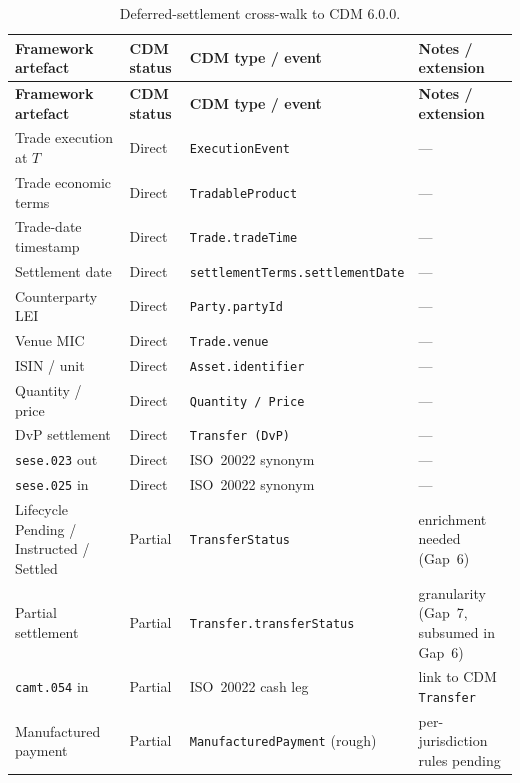 \documentclass[11pt,a4paper]{article}
\begin{document}
\begin{small}
\begin{longtable}{p{4.2cm}p{2.2cm}p{4.5cm}p{4.2cm}}
\caption{Deferred-settlement cross-walk to CDM 6.0.0.}\\
\toprule
\textbf{Framework artefact} & \textbf{CDM status} & \textbf{CDM type / event} & \textbf{Notes / extension} \\
\midrule
\endfirsthead
\toprule
\textbf{Framework artefact} & \textbf{CDM status} & \textbf{CDM type / event} & \textbf{Notes / extension} \\
\midrule
\endhead
Trade execution at $T$               & Direct  & \texttt{ExecutionEvent}            & --- \\
Trade economic terms                 & Direct  & \texttt{TradableProduct}           & --- \\
Trade-date timestamp                 & Direct  & \texttt{Trade.tradeTime}           & --- \\
Settlement date                      & Direct  & \texttt{settlementTerms.settlementDate} & --- \\
Counterparty LEI                     & Direct  & \texttt{Party.partyId}             & --- \\
Venue MIC                            & Direct  & \texttt{Trade.venue}               & --- \\
ISIN / unit                          & Direct  & \texttt{Asset.identifier}          & --- \\
Quantity / price                     & Direct  & \texttt{Quantity / Price}          & --- \\
DvP settlement                       & Direct  & \texttt{Transfer (DvP)}            & --- \\
\texttt{sese.023} out                & Direct  & ISO~20022 synonym                  & --- \\
\texttt{sese.025} in                 & Direct  & ISO~20022 synonym                  & --- \\
Lifecycle Pending / Instructed / Settled & Partial & \texttt{TransferStatus}        & enrichment needed (Gap~6) \\
Partial settlement                   & Partial & \texttt{Transfer.transferStatus}   & granularity (Gap~7, subsumed in Gap~6) \\
\texttt{camt.054} in                 & Partial & ISO~20022 cash leg                 & link to CDM \texttt{Transfer} \\
Manufactured payment                 & Partial & \texttt{ManufacturedPayment} (rough) & per-jurisdiction rules pending \\

\end{longtable}
\end{small}
\end{document}
